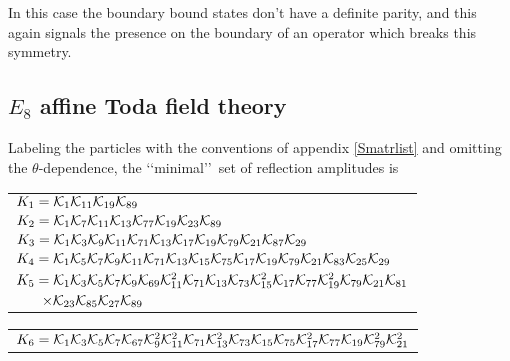 \documentclass[a4paper,12pt]{report}
\begin{document}
\vspace{0.5cm}

In this case the boundary bound states don't have a definite parity, and this again signals the presence on the
boundary of an operator which breaks this symmetry.


\subsection{$E_{8}$ affine Toda field theory}

Labeling the particles with the conventions of appendix \ref{Smatrlist} and omitting the $\theta$-dependence, the
\lq\lq minimal\rq\rq \, set of reflection amplitudes is

\begin{center}
\begin{tabular}{l}
$K_{1}={\cal K}_{1}{\cal K}_{11}{\cal K}_{19}{\cal K}_{89}$  \\
$K_{2}={\cal K}_{1}{\cal K}_{7}{\cal K}_{11} {\cal K}_{13}{\cal K}_{77}{\cal K}_{19}{\cal K}_{23}{\cal K}_{89} $\\
$K_{3}={\cal K}_{1}{\cal K}_{3}{\cal K}_{9}{\cal K}_{11}{\cal K}_{71}{\cal K}_{13} {\cal K}_{17}{\cal K}_{19}
                     {\cal K}_{79}{\cal K}_{21}{\cal K}_{87}{\cal K}_{29}$ \\
$K_{4}={\cal K}_{1}{\cal K}_{5}{\cal K}_{7}{\cal K}_{9}{\cal K}_{11}{\cal K}_{71}{\cal K}_{13} {\cal K}_{15}
                     {\cal K}_{75}{\cal K}_{17}{\cal K}_{19}{\cal K}_{79}{\cal K}_{21}{\cal K}_{83}{\cal K}_{25}{\cal K}_{29}$ \\
$K_{5}={\cal K}_{1}{\cal K}_{3}{\cal K}_{5}{\cal K}_{7}{\cal K}_{9}{\cal K}_{69}{\cal K}_{11}^{2}{\cal K}_{71}
                     {\cal K}_{13}{\cal K}_{73}{\cal K}_{15}^{2}{\cal K}_{17}{\cal K}_{77}{\cal K}_{19}^{2}{\cal K}_{79}
                     {\cal K}_{21}{\cal K}_{81}$\\
                   $ \quad \;\;\; \times{\cal K}_{23}{\cal K}_{85}{\cal K}_{27}{\cal K}_{89} $ \\
\end{tabular}

\begin{tabular}{l}
$K_{6}={\cal K}_{1}{\cal K}_{3}{\cal K}_{5}{\cal K}_{7}{\cal K}_{67}{\cal K}_{9}^{2}{\cal K}_{11}^{2}
                     {\cal K}_{71} {\cal K}_{13}^{2}{\cal K}_{73}{\cal K}_{15}{\cal K}_{75}{\cal K}_{17}^{2}{\cal K}_{77}
                     {\cal K}_{19}{\cal K}_{79}^{2}{\cal K}_{21}^{2}$\\


\end{tabular}
\end{center}
\end{document}
